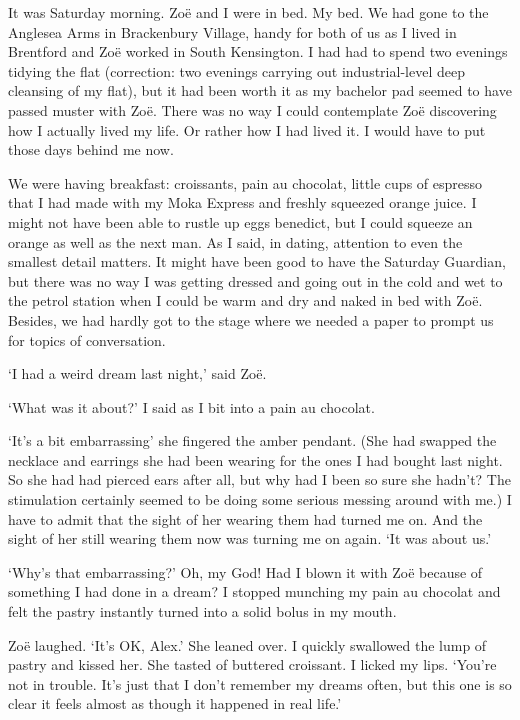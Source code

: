 It was Saturday morning. Zoë and I were in bed. {\twelveit My\/}
bed. We had gone to the Anglesea Arms in Brackenbury Village, handy
for both of us as I lived in Brentford and Zoë worked in South
Kensington. I had had to spend two evenings tidying the flat
(correction: two evenings carrying out industrial-level deep
cleansing of my flat), but it had been worth it as my bachelor pad
seemed to have passed muster with Zoë. There was no way I could
contemplate Zoë discovering how I actually lived my life. Or
rather how I had lived it. I would have to put those days behind me
now.

We were having breakfast: croissants, pain au chocolat, little cups
of espresso that I had made with my Moka Express and freshly
squeezed orange juice. I might not have been able to rustle up eggs
benedict, but I could squeeze an orange as well as the next man. As
I said, in dating, attention to even the smallest detail matters. It
might have been good to have the Saturday {\twelvesl Guardian\/},
but there was no way I was getting dressed and going out in the cold
and wet to the petrol station when I could be warm and dry and naked
in bed with Zoë. Besides, we had hardly got to the stage where
we needed a paper to prompt us for topics of conversation.

`I had a weird dream last night,' said Zoë.

`What was it about?' I said as I bit into a pain au chocolat.

`It's a bit embarrassing' she fingered the amber pendant. (She had swapped the necklace and earrings she had been wearing for the ones I had bought last night. So she had had pierced ears after all, but why had I been so sure she hadn't? The stimulation certainly seemed to be doing some serious messing around with me.) I have to admit that the sight of her
wearing them had turned me on. And the sight of her still wearing
them now was turning me on again. `It was
about us.'

`Why's that embarrassing?' Oh, my God! Had I blown it with Zoë
because of something I had done in a dream? I stopped munching my
pain au chocolat and felt the pastry instantly turned into a solid
bolus in my mouth.

Zoë laughed. `It's OK, Alex.' She leaned over. I quickly
swallowed the lump of pastry and kissed her. She tasted of buttered
croissant. I licked my lips. `You're not in trouble. It's just that
I don't remember my dreams often, but this one is so clear it feels almost as though it happened in real life.'

